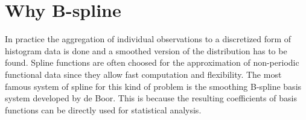 \section{Why B-spline }
In practice the aggregation of individual observations to a discretized form of histogram data is done and a smoothed version of the distribution has to be found.
Spline functions are often choosed for the approximation of non-periodic functional data since they allow fast computation and flexibility. The most famous system of spline for this kind of problem is the smoothing B-spline basis system developed by de Boor. This is because the resulting coefficients of basis functions can be directly used for statistical analysis. %